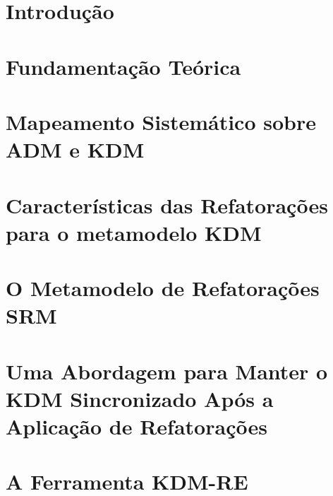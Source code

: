 \documentclass[doutorado, pre-defesa, spanish, english, brazil]{packages/icmc}
\begin{document}
\textual

\chapter{Introdução}
\label{chapter:introducao}


\chapter{Fundamentação Teórica}
\label{chapter:fundamentacao_teorica}


%

\chapter{Mapeamento Sistemático sobre ADM e KDM}\label{chapter:mapeamento_sistematico}


\chapter{Características das Refatorações para o metamodelo KDM}\label{chapter:catalogo_refactoring_KDM}


\chapter{O Metamodelo de Refatorações SRM}
\label{chapter:Toward_a_Refactoring_Metamodel_for_KDM}


\chapter{Uma Abordagem para Manter o KDM Sincronizado Após a Aplicação de Refatorações}\label{chapter:Abordagem_de_sincronizacao}


\chapter{A Ferramenta KDM-RE}\label{chapter:ferramenta_kdm_re}

\end{document}
